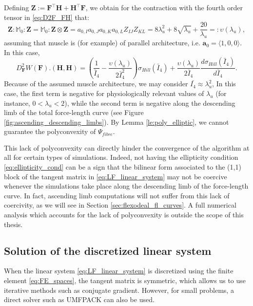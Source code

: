 \documentclass{sfuthesis}
\numberwithin{equation}{section}
\numberwithin{figure}{chapter}
\numberwithin{table}{chapter}
\theoremstyle{definition}
\def\*#1{{\mathbf{#1}}} %
\newcommand{\I}{{\bar{I}}}
\begin{document}
Defining $\*Z := \*F^\top \*H + \*H^\top \*F$, we obtain for the contraction with the fourth order tensor in \eqref{eq:D2F_FH} that:
\begin{equation}
    \*Z : \mathbb{M}_0 : \*Z = \mathbb{M}_0 : \*Z \otimes \*Z = a_{0,I} a_{0,J} a_{0,K} a_{0,L} Z_{IJ} Z_{KL} = 8\lambda_u^2 + 8 \sqrt{\lambda_u} + \dfrac{20}{\lambda_u} =: \upsilon(\lambda_u),
\end{equation}
assuming that muscle is (for example) of parallel architecture, i.e. $\*a_0 = \langle 1,0,0 \rangle$. In this case,
\begin{equation}
    D_{\*F}^2 W(\*F).(\*H, \*H)  = \left(\dfrac{1}{\I_4} - \dfrac{\upsilon(\lambda_u)}{2\I_4^2} \right)\sigma_{Hill}(\I_4)  + \dfrac{\upsilon(\lambda_u)}{2\I_4} \dfrac{d \sigma_{Hill}(\I_4)}{d\I_4}.
\end{equation}
Because of the assumed muscle architecture, we may consider $\bar{I_4} \approx \lambda_u^2$, In this case, the first term is negative for physiologically relevant values of $\lambda_u$ (for instance, $0 < \lambda_u < 2$), while the second term  is negative along the descending limb of the total force-length curve (see Figure \ref{fig:ascending_descending_limbs}). By Lemma \ref{le:poly_elliptic}, we cannot guarantee the polyconvexity of $\Psi_{fibre}$.

This lack of polyconvexity can directly hinder the convergence of the algorithm at all for certain types of simulations. Indeed, not having the ellipticity condition \eqref{eq:ellipticity_cond} can be a sign that the bilinear form associated to the (1,1) block of the tangent matrix in \eqref{eq:LF_linear_system} may not be coercive whenever the simulations take place along the descending limb of the force-length curve. In fact, ascending limb computations will not suffer from this lack of coercivity, as we will see in Section \ref{sec:flexodeal_fl_curves}. A full numerical analysis which accounts for the lack of polyconvexity is outside the scope of this thesis.


\subsection{Solution of the discretized linear system}

When the linear system \eqref{eq:LF_linear_system} is discretized using the finite element \eqref{eq:FE_spaces}, the tangent matrix is symmetric, which allows us to use iterative methods such as conjugate gradient. However, for small problems, a direct solver such as UMFPACK can also be used.
\end{document}
